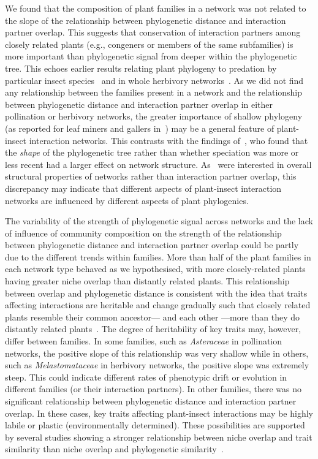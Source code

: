 \documentclass[12pt]{article}
\begin{document}
\begin{spacing}{1.5}
  We found that the composition of plant families in a network
  was not related to the slope of the relationship between phylogenetic
  distance and interaction partner overlap. This suggests that 
  conservation of interaction partners among closely related plants
  (e.g., congeners or members of the same subfamilies) is more
  important than phylogenetic signal from deeper within the phylogenetic
  tree. This echoes earlier results relating plant phylogeny to 
  predation by particular insect species~\citep{Novotny2002,Novotny2004,
  Odegaard2005} and in whole herbivory networks~\citep{Volf2017}. As
  we did not find any relationship between the families present in
  a network and the relationship between phylogenetic distance and
  interaction partner overlap in either pollination or herbivory networks,
  the greater importance of shallow phylogeny (as reported for leaf
  miners and gallers in~\citet{Volf2017}) may be a general 
  feature of plant-insect interaction networks. This contrasts with
  the findings of~\citet{Chamberlain2014}, who found that the \emph{shape}
  of the phylogenetic tree rather than whether speciation was more or
  less recent had a larger effect on network structure. As~\citet{Chamberlain2014}
  were interested in overall structural properties of networks rather
  than interaction partner overlap, this discrepancy may indicate that
  different aspects of plant-insect interaction networks are influenced
  by different aspects of plant phylogenies.


  The variability of the strength of phylogenetic signal across networks 
  and the lack of influence of community composition on the strength of 
  the relationship between phylogenetic distance and interaction partner
  overlap could be partly due to the different trends within families. 
  More than half of the plant families in each network type
  behaved as we hypothesised, with more 
  closely-related plants having greater niche overlap than 
  distantly related plants. This relationship between overlap and 
  phylogenetic distance is consistent with the idea that traits affecting 
  interactions are heritable and change gradually
  such that closely related plants resemble their common ancestor--- and
  each other ---more than they do distantly related 
  plants~\citep{Schemske1999,Gilbert2015,Ponisio2017}. The degree of 
  heritability of key traits may, however, differ between families. In
  some families, such as \emph{Asteraceae} in pollination networks, 
  the positive slope of this relationship was very shallow while in 
  others, such as \emph{Melastomataceae} in herbivory networks, the 
  positive slope was extremely steep. This could indicate different 
  rates of phenotypic drift or evolution in different families (or their interaction partners). 
  In other families, there was no significant relationship between phylogenetic
  distance and interaction partner overlap. In these cases, key traits affecting 
  plant-insect interactions may be highly labile or plastic (environmentally determined). These possibilities are supported by several studies showing a stronger relationship between niche overlap and trait similarity than niche overlap and phylogenetic similarity~\citep{Junker2015,Ibanez2016,Endara2017}. 



\end{spacing}
\end{document}
